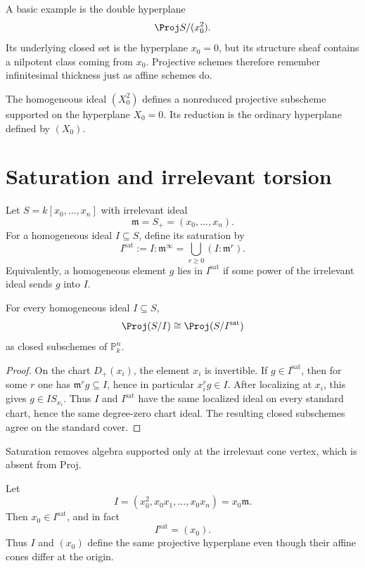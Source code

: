 A basic example is the double hyperplane
\[
  \Proj S/(x_0^2).
\]
Its underlying closed set is the hyperplane \(x_0=0\), but its structure sheaf contains a nilpotent class coming from \(x_0\).  Projective schemes therefore remember infinitesimal thickness just as affine schemes do.



\begin{example}\label{ex:vi37-expand-02}
The homogeneous ideal $(X_0^2)$ defines a nonreduced projective subscheme supported on the hyperplane $X_0=0$.  Its reduction is the ordinary hyperplane defined by $(X_0)$.
\end{example}
\section{Saturation and irrelevant torsion}
Let \(S=k[x_0,\ldots,x_n]\) with irrelevant ideal
\[
  \mathfrak m=S_+=(x_0,\ldots,x_n).
\]
For a homogeneous ideal \(I\subseteq S\), define its saturation by
\[
  I^{\mathrm{sat}}
  :=I:\mathfrak m^\infty
  =\bigcup_{r\ge0}(I:\mathfrak m^r).
\]
Equivalently, a homogeneous element \(g\) lies in \(I^{\mathrm{sat}}\) if some power of the irrelevant ideal sends \(g\) into \(I\).

\begin{theorem}\label{thm:vi37-saturation}
For every homogeneous ideal \(I\subseteq S\),
\[
  \Proj(S/I)\cong\Proj(S/I^{\mathrm{sat}})
\]
as closed subschemes of \(\mathbb P^n_k\).
\end{theorem}

\begin{proof}
On the chart \(D_+(x_i)\), the element \(x_i\) is invertible.  If \(g\in I^{\mathrm{sat}}\), then for some \(r\) one has \(\mathfrak m^r g\subseteq I\), hence in particular \(x_i^r g\in I\).  After localizing at \(x_i\), this gives \(g\in IS_{x_i}\).  Thus \(I\) and \(I^{\mathrm{sat}}\) have the same localized ideal on every standard chart, hence the same degree-zero chart ideal.  The resulting closed subschemes agree on the standard cover.
\end{proof}

Saturation removes algebra supported only at the irrelevant cone vertex, which is absent from Proj.

\begin{example}
Let
\[
  I=(x_0^2,x_0x_1,\ldots,x_0x_n)=x_0\mathfrak m.
\]
Then \(x_0\in I^{\mathrm{sat}}\), and in fact
\[
  I^{\mathrm{sat}}=(x_0).
\]
Thus \(I\) and \((x_0)\) define the same projective hyperplane even though their affine cones differ at the origin.
\end{example}

